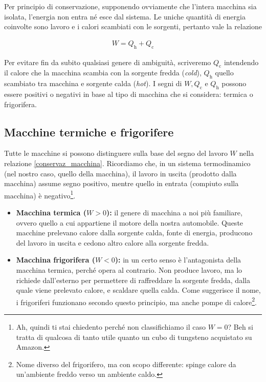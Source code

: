 Per principio di conservazione, supponendo
ovviamente che l'intera macchina sia isolata, l'energia
non entra né esce dal sistema. Le uniche quantità di energia
coinvolte sono lavoro e i calori scambiati con le sorgenti,
pertanto vale la relazione

\begin{align}
    W = Q_\text{h} + Q_\text{c}\label{conservaz_macchina}
\end{align}

\noindent Per evitare fin da subito qualsiasi genere di
ambiguità, scriveremo $Q_\text{c}$ intendendo il calore che
la macchina scambia con la sorgente fredda (\textit{cold}),
$Q_\text{h}$ quello scambiato tra macchina e sorgente calda
(\textit{hot}). I segni di $W, Q_\text{c}$ e $Q_\text{h}$
possono essere positivi o negativi in base al tipo di
macchina che si considera: termica o frigorifera.

\subsection{Macchine termiche e frigorifere}
Tutte le macchine si possono distinguere sulla base del segno
del lavoro $W$ nella relazione \ref{conservaz_macchina}. Ricordiamo
che, in un sistema termodinamico (nel nostro caso, quello della
macchina), il lavoro in uscita (prodotto dalla macchina) assume
segno positivo, mentre quello in entrata (compiuto sulla macchina)
è negativo\footnote{Ah, quindi ti stai chiedento perché non classifichiamo
il caso $W = 0$? Beh si tratta di qualcosa di tanto utile quanto un
cubo di tungsteno acquistato su Amazon.}.

\begin{itemize}
    \item \textbf{Macchina termica ($W > 0$):} il genere di macchina a noi
    più familiare, ovvero quello a cui appartiene il motore della
    nostra automobile. Queste macchine prelevano calore dalla sorgente
    calda, fonte di energia, producono del lavoro in uscita e cedono
    altro calore alla sorgente fredda.

    \item \textbf{Macchina frigorifera ($W < 0$):} in un certo senso
    è l'antagonista della macchina termica, perché opera al contrario.
    Non produce lavoro, ma lo richiede dall'esterno per permettere di
    raffreddare la sorgente fredda, dalla quale viene prelevato calore,
    e scaldare quella calda. Come suggerisce il nome, i frigoriferi
    funzionano secondo questo principio, ma anche
    pompe di calore\footnote{Nome diverso del frigorifero, ma con
    scopo differente: spinge calore da un'ambiente freddo verso
    un ambiente caldo.}.
\end{itemize}

